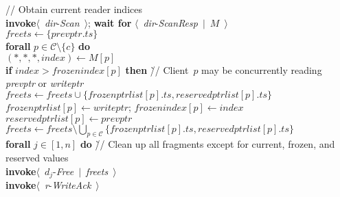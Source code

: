 \documentclass[oribibl]{llncs}
\theoremstyle{definition-boldhead}
\newcommand{\var}[1]{\textit{#1}}
\newcommand{\newe}{{\bf invoke}\xspace}
\newcommand{\event}[2]{$\langle$~{\var{#1}}-\textsl{#2}~$\rangle$}
\newcommand{\eventt}[3]{$\langle$~{\var{#1}}-\textsl{#2}~$\mid$~{#3}~$\rangle$}
\newcommand{\becomes}{\ensuremath{\leftarrow}}
\newcommand{\clientset}{\ensuremath{\mathcal{C}}\xspace}
\newcommand{\NAME}{AWE\xspace}
\begin{document}
\begin{alg}
\begin{tabbing}
\> \> // Obtain current reader indices \\
  \> \> \newe \event{dir}{Scan};
        \textbf{wait for} \eventt{dir}{ScanResp}{$M$} \\
  \> \> $\var{freets} \becomes \{ \var{prevptr}.\var{ts} \}$ \\
  \> \> \textbf{forall} $p \in \clientset \setminus \{c\}$ \textbf{do} \\
  \> \> \> $(\ast, \ast, \ast, \var{index}) \becomes M[p]$ \\
  \> \> \> \textbf{if} $\var{index} > \var{frozenindex}[p]$ \textbf{then}
           \` // Client~$p$ may be concurrently reading \var{prevptr}
                 or \var{writeptr} \\
  \> \> \> \> $\var{freets} \becomes \var{freets}
                 \cup \{ \var{frozenptrlist}[p].\var{ts},
                         \var{reservedptrlist}[p].\var{ts} \}$ \\
  \> \> \> \> $\var{frozenptrlist}[p] \becomes \var{writeptr}$;
              $\var{frozenindex}[p] \becomes \var{index}$ \\
  \> \> \> \> $\var{reservedptrlist}[p] \becomes \var{prevptr}$ \\
  \> \> $\var{freets} \becomes \var{freets} \setminus
           \bigcup_{p \in \clientset} \{ \var{frozenptrlist}[p].\var{ts},
                                         \var{reservedptrlist}[p].\var{ts} \}$ \\
  \> \> \textbf{forall} $j \in [1,n]$ \textbf{do}
        \` // Clean up all fragments except for current, frozen, and reserved values \\
  \> \> \> \newe \eventt{$d_j$}{Free}{\var{freets}}\\
\> \> \newe \event{r}{WriteAck}
\end{tabbing}
\caption{Protocol~\NAME, atomic register instance~\var{r}
  for client~$c$ (part~1).}
\label{alg:client-1}
\end{alg}
\end{document}

